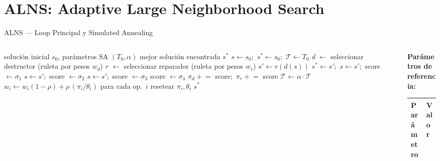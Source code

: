 \documentclass[aspectratio=169,10pt]{beamer}
\begin{document}
\section{ALNS: Adaptive Large Neighborhood Search}

\begin{frame}{ALNS --- Loop Principal y Simulated Annealing}
  \begin{columns}[T,onlytextwidth]
    \begin{column}{0.50\textwidth}
      \begin{algorithm}[H]
        \caption{\small Loop ALNS}
        \begin{algorithmic}[1]\tiny
          \Require solución inicial $s_0$, parámetros SA $(T_0, \alpha)$
          \Ensure  mejor solución encontrada $s^*$
          \State $s \gets s_0$;\ $s^* \gets s_0$;\ $\mathcal{T} \gets T_0$
            \State \textit{d} $\gets$ seleccionar destructor (ruleta por pesos $w_d$)
            \State \textit{r} $\gets$ seleccionar reparador (ruleta por pesos $w_r$)
            \State $s' \gets r(d(s))$
              \State $s^* \gets s'$;\ $s \gets s'$;\ score $\gets \sigma_1$
              \State $s \gets s'$;\ score $\gets \sigma_2$
              \State $s \gets s'$;\ score $\gets \sigma_3$
            \Else
              \State score $\gets \sigma_4$
            \EndIf
            \State $\pi_d \mathrel{+}=$ score;\ $\pi_r \mathrel{+}=$ score
            \State $\mathcal{T} \gets \alpha \cdot \mathcal{T}$
              \State $w_i \gets w_i(1-\rho)+\rho\,(\pi_i/\theta_i)$ para cada op.\ $i$
              \State resetear $\pi_i, \theta_i$
            \EndIf
          \EndWhile
          \State \Return $s^*$
        \end{algorithmic}
      \end{algorithm}
    \end{column}
    \begin{column}{0.48\textwidth}
      \textbf{Parámetros de referencia:}
      \vspace{0.2em}
      \begin{center}\footnotesize
      \begin{tabular}{ll}
        \toprule
        Parámetro & Valor \\
        \midrule

\end{tabular}
\end{center}
\end{column}
\end{columns}
\end{frame}
\end{document}

